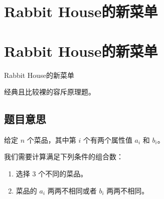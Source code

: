 \def\sectionName{Rabbit House的新菜单}



\isBeamerMode\relax
    \section[\TOCName]{\sectionName}
\fi
\isBeamerMode\relax
    \section[\TOCName\ -\ \sectionName]{\sectionName}
\fi

\begin{frame}

\isBeamerMode\relax
    {\Huge \sectionName}\par
\fi




经典且比较裸的容斥原理题。



\end{frame}

\subsection{题目意思}
\begin{frame} %
给定 $n$ 个菜品，其中第 $i$ 个有两个属性值 $a_i$ 和 $b_i$。

我们需要计算满足下列条件的组合数：
\begin{enumerate}
    \item 选择 $3$ 个不同的菜品。
    \item 菜品的 $a_i$ 两两不相同或者 $b_i$ 两两不相同。
\end{enumerate}
\end{frame}



